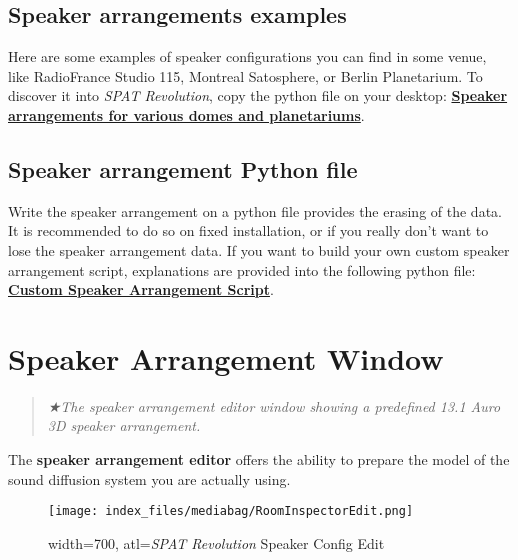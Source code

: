\documentclass[
  letterpaper,
  DIV=11,
  numbers=noendperiod]{scrreport}
\begin{document}
\hypertarget{speaker-arrangements-examples}{%
\section{Speaker arrangements
examples}\label{speaker-arrangements-examples}}

Here are some examples of speaker configurations you can find in some
venue, like RadioFrance Studio 115, Montreal Satosphere, or Berlin
Planetarium. To discover it into \emph{SPAT Revolution}, copy the python
file on your desktop:
\textbf{\href{https://public.3.basecamp.com/p/pPtg3qFrUsxyPPmQ3b3JLPqW}{Speaker
arrangements for various domes and planetariums}}.

\hypertarget{speaker-arrangement-python-file}{%
\section{Speaker arrangement Python
file}\label{speaker-arrangement-python-file}}

Write the speaker arrangement on a python file provides the erasing of
the data. It is recommended to do so on fixed installation, or if you
really don't want to lose the speaker arrangement data. If you want to
build your own custom speaker arrangement script, explanations are
provided into the following python file:
\textbf{\href{https://public.3.basecamp.com/p/rQStK3igPkaXisYS4Gs5sJ2g}{Custom
Speaker Arrangement Script}}.

\hypertarget{speaker-arrangement-window}{%
\chapter{Speaker Arrangement Window}\label{speaker-arrangement-window}}

\begin{quote}
\emph{★The speaker arrangement editor window showing a predefined 13.1
Auro 3D speaker arrangement.}
\end{quote}

The \textbf{speaker arrangement editor} offers the ability to prepare
the model of the sound diffusion system you are actually using.

\begin{figure}

{\centering \texttt{[image: index\_files/mediabag/RoomInspectorEdit.png]}

}

\caption{width=700, atl=\emph{SPAT Revolution} Speaker Config Edit}

\end{figure}
\end{document}
